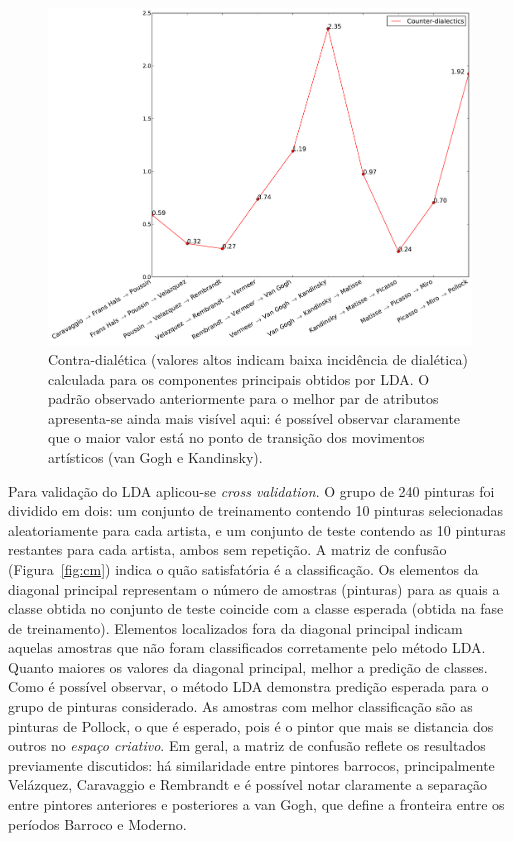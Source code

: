 \begin{figure}[h!]
\begin{center}
        \includegraphics[width=\columnwidth]{figs/caso3_dialetica}
      \caption{Contra-dialética (valores altos indicam baixa
        incidência de dialética) calculada para os componentes principais
        obtidos por LDA. O padrão observado anteriormente para o melhor par de
        atributos apresenta-se ainda mais visível aqui: é possível observar
        claramente que o maior valor está no ponto de transição dos movimentos
        artísticos (van Gogh e Kandinsky).}
        \label{fig:caso3_dialetica}
\end{center}
\end{figure}

Para validação do LDA aplicou-se \textit{cross validation}. O grupo de
240 pinturas foi dividido em dois: um conjunto de treinamento contendo
10 pinturas selecionadas aleatoriamente para cada artista, e um
conjunto de teste contendo as 10 pinturas restantes para cada artista,
ambos sem repetição. A matriz de confusão (Figura~\ref{fig:cm}) indica
o quão satisfatória é a classificação. Os elementos da diagonal
principal representam o número de amostras (pinturas) para as quais a
classe obtida no conjunto de teste coincide com a classe esperada
(obtida na fase de treinamento). Elementos localizados fora da
diagonal principal indicam aquelas amostras que não foram
classificados corretamente pelo método LDA. Quanto maiores os valores
da diagonal principal, melhor a predição de classes. Como é possível
observar, o método LDA demonstra predição esperada para o grupo de
pinturas considerado. As amostras com melhor classificação são as
pinturas de Pollock, o que é esperado, pois é o pintor que mais se
distancia dos outros no \textit{espaço criativo}. Em geral, a matriz
de confusão reflete os resultados previamente discutidos: há
similaridade entre pintores barrocos, principalmente Velázquez,
Caravaggio e Rembrandt e é possível notar claramente a separação entre
pintores anteriores e posteriores a van Gogh, que define a fronteira
entre os períodos Barroco e Moderno.

